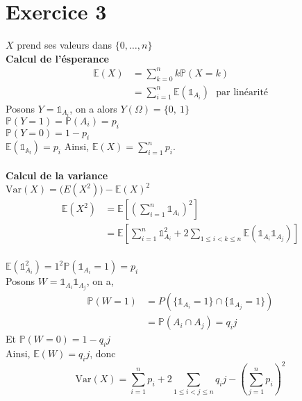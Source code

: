 \documentclass[td3.tex]{subfiles}
\begin{document}
\section{Exercice 3}
$X$ prend ses valeurs dans $\{0,\dots,n\}$\\
\textbf{Calcul de l'ésperance}\\
\begin{align*}
  \mathbb{E}(X) &= \sum_{k=0}^n k \mathbb{P}(X=k) \\
  &= \sum_{i=1}^n \mathbb{E}(\mathds{1}_{A_i})~~~ \text{par linéarité}
\end{align*}
Posons $Y=\mathds{1}_{A_i}$, on a alors $Y(\Omega) = \{0,~1 \}$ \\
$\mathbb{P}(Y=1) = \mathbb{P}(A_i) = p_i$ \\
$\mathbb{P}(Y=0) = 1-p_i$ \\
$\mathbb{E}(\mathds{1_{A_i}}) = p_i$
Ainsi, $\mathbb{E}(X) = \sum_{i=1}^n p_i$. \\ \\
\textbf{Calcul de la variance}\\
$\mathrm{Var}(X) = \mathbb(E(X^2)) - \mathbb{E}(X)^2$
\begin{align*}
  \mathbb{E}(X^2) &= \mathbb{E}[(\sum_{i=1}^n\mathds{1}_{A_i})^2] \\
  &=\mathbb{E}[\sum_{i=1}^n \mathds{1}_{A_i}^2 + 2\sum_{1 \leq i < k \leq n}\mathbb{E}(\mathds{1}_{A_i}\mathds{1}_{A_j})] \\
\end{align*}

$\mathbb{E}(\mathds{1}_{A_i}^2) = 1^2 \mathbb{P}(\mathds{1}_{A_i} = 1) = p_i$\\
Posons $W = \mathds{1}_{A_i}\mathds{1}_{A_j}$, on a, \\
\begin{align*}
 \mathbb{P}(W=1) &= P(\{\mathds{1}_{A_i} = 1\} \cap \{\mathds{1}_{A_j} = 1\}) \\
 &= \mathbb{P}(A_i \cap A_j) = q_ij
\end{align*}
Et $\mathbb{P}(W=0) = 1 - q_ij$ \\
Ainsi, $\mathbb{E}(W) = q_ij$, donc
$$\mathrm{Var}(X) = \sum_{i=1}^n p_i + 2\sum_{1 \leq i < j \leq n} q_ij -(\sum_{j=1}^n p_i)^2$$
\end{document}
